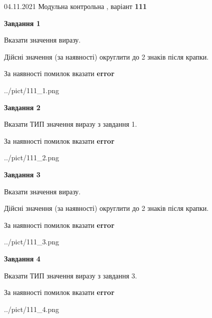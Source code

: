 \documentclass[11pt, ukrainian]{article}
\begin{document}
{04.11.2021 Модульна контрольна , варіант  \No \textbf { 111 }\par}
{
\begin {large}
{\begin {center}\textbf{Завдання 1}\end {center}}\par
Вказати значення виразу. \par
Дійсні значення (за наявності) округлити до 2 знаків після крапки. \par
За наявності помилок вказати \textbf{error}

\begin{center}
	{../pict/111_1.png}
\end{center}
\newpage

{\begin {center}\textbf{Завдання 2}\end {center}}\par
Вказати ТИП значення виразу з завдання 1. \par
За наявності помилок вказати \textbf{error}

\begin{center}
	{../pict/111_2.png}
\end{center}
\newpage

{\begin {center}\textbf{Завдання 3}\end {center}}\par
Вказати значення виразу. \par
Дійсні значення (за наявності) округлити до 2 знаків після крапки. \par
За наявності помилок вказати \textbf{error}

\begin{center}
	{../pict/111_3.png}
\end{center}
\newpage

{\begin {center}\textbf{Завдання 4}\end {center}}\par
Вказати ТИП значення виразу з завдання 3. \par
За наявності помилок вказати \textbf{error}

\begin{center}
	{../pict/111_4.png}
\end{center}
\newpage


\end{large}}
\end{document}
